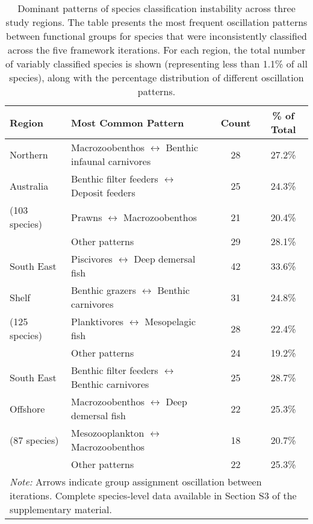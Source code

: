 \begin{table}[htbp]
\centering
\caption{Dominant patterns of species classification instability across three study regions. The table presents the most frequent oscillation patterns between functional groups for species that were inconsistently classified across the five framework iterations. For each region, the total number of variably classified species is shown (representing less than 1.1\% of all species), along with the percentage distribution of different oscillation patterns.}
\label{tab:unstable_species}
\small
\begin{tabular}{llcc}
\hline
Region & Most Common Pattern & Count & \% of Total \\
\hline
Northern & Macrozoobenthos $\leftrightarrow$ Benthic infaunal carnivores & 28 & 27.2\% \\
Australia & Benthic filter feeders $\leftrightarrow$ Deposit feeders & 25 & 24.3\% \\
(103 species) & Prawns $\leftrightarrow$ Macrozoobenthos & 21 & 20.4\% \\
& Other patterns & 29 & 28.1\% \\
\hline
South East & Piscivores $\leftrightarrow$ Deep demersal fish & 42 & 33.6\% \\
Shelf & Benthic grazers $\leftrightarrow$ Benthic carnivores & 31 & 24.8\% \\
(125 species) & Planktivores $\leftrightarrow$ Mesopelagic fish & 28 & 22.4\% \\
& Other patterns & 24 & 19.2\% \\
\hline
South East & Benthic filter feeders $\leftrightarrow$ Benthic carnivores & 25 & 28.7\% \\
Offshore & Macrozoobenthos $\leftrightarrow$ Deep demersal fish & 22 & 25.3\% \\
(87 species) & Mesozooplankton $\leftrightarrow$ Macrozoobenthos & 18 & 20.7\% \\
& Other patterns & 22 & 25.3\% \\
\hline
\multicolumn{4}{p{0.95\textwidth}}{\small \textit{Note:} Arrows indicate group assignment oscillation between iterations. Complete species-level data available in Section S3 of the supplementary material.} \\
\hline
\end{tabular}
\end{table}
